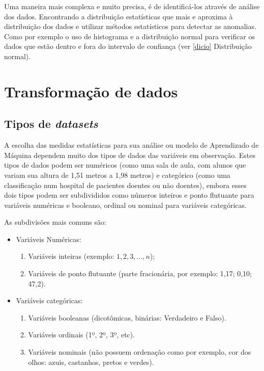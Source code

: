 \documentclass[
  openany]{book}
\providecommand{\tightlist}{%
  \setlength{\itemsep}{0pt}\setlength{\parskip}{0pt}}
\begin{document}
Uma maneira mais complexa e muito precisa, é de identificá-los através de análise dos dados. Encontrando a distribuição estatísticas que mais e aproxima à distribuição dos dados e utilizar métodos estatísticos para detectar as anomalias. Como por exemplo o uso de histograma e a distribuição normal para verificar os dados que estão dentro e fora do intervalo de confiança (ver \ref{dicio} Distribuição normal).

\hypertarget{transformauxe7uxe3o-de-dados}{%
\section{Transformação de dados}\label{transformauxe7uxe3o-de-dados}}

\hypertarget{tipos-de-datasets}{%
\subsection{\texorpdfstring{Tipos de \emph{datasets}}{Tipos de datasets}}\label{tipos-de-datasets}}

A escolha das medidas estatísticas para sua análise ou modelo de Aprendizado de Máquina dependem muito dos tipos de dados das variáveis em observação. Estes tipos de dados podem ser numéricos (como uma sala de aula, com alunos que variam sua altura de 1,51 metros a 1,98 metros) e categórico (como uma classificação num hospital de pacientes doentes ou não doentes), embora esses dois tipos podem ser subdivididos como números inteiros e ponto flutuante para variáveis numéricas e booleano, ordinal ou nominal para variáveis categóricas.

As subdivisões mais comuns são:

\begin{itemize}
\tightlist
\item
  Variáveis Numéricas:

  \begin{enumerate}
  \def\labelenumi{\arabic{enumi}.}
  \tightlist
  \item
    Variáveis inteiras (exemplo: \(1,2,3,..., n\));
  \item
    Variáveis de ponto flutuante (parte fracionária, por exemplo: 1,17; 0,10; 47,2).
  \end{enumerate}
\item
  Variáveis categóricas:

  \begin{enumerate}
  \def\labelenumi{\arabic{enumi}.}
  \tightlist
  \item
    Variáveis booleanas (dicotômicas, binárias: Verdadeiro e Falso).
  \item
    Variáveis ordinais (1º, 2º, 3º, etc).
  \item
    Variáveis nominais (não possuem ordenação como por exemplo, cor dos olhos: azuis, castanhos, pretos e verdes).
  \end{enumerate}
\end{itemize}
\end{document}
